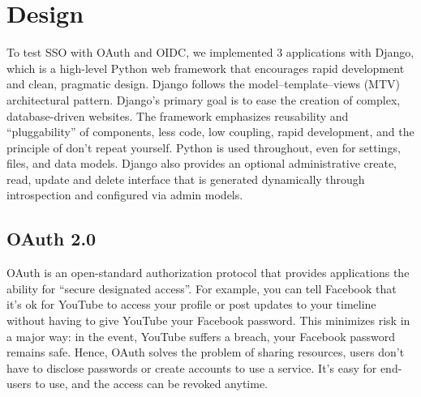 \section{Design}

To test SSO with OAuth and OIDC, we implemented 3 applications with Django, which is a high-level Python web framework that encourages rapid development and clean, pragmatic design. Django follows the model–template–views (MTV) architectural pattern. Django's primary goal is to ease the creation of complex, database-driven websites. The framework emphasizes reusability and ``pluggability'' of components, less code, low coupling, rapid development, and the principle of don't repeat yourself. Python is used throughout, even for settings, files, and data models. Django also provides an optional administrative create, read, update and delete interface that is generated dynamically through introspection and configured via admin models.



\subsection{OAuth 2.0}

OAuth is an open-standard authorization protocol that provides applications the ability for ``secure designated access''. For example, you can tell Facebook that it’s ok for YouTube to access your profile or post updates to your timeline without having to give YouTube your Facebook password. This minimizes risk in a major way: in the event, YouTube suffers a breach, your Facebook password remains safe. Hence, OAuth solves the problem of sharing resources, users don't have to disclose passwords or create accounts to use a service. It's easy for end-users to use, and the access can be revoked anytime.

